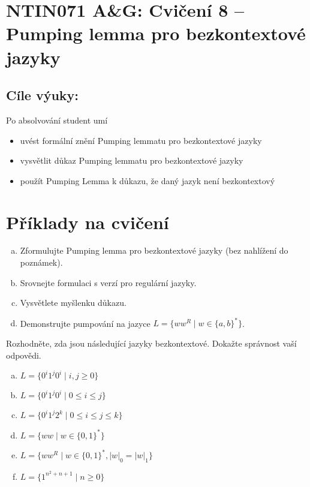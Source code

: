 \documentclass[a4paper,12pt]{amsart}
\begin{document}
\thispagestyle{empty}

\section*{NTIN071 A\&G: Cvičení 8 -- Pumping lemma pro bezkontextové jazyky}

\medskip

\subsection*{Cíle výuky:} Po absolvování student umí

\begin{itemize}\setlength{\itemsep}{0pt}
    \item uvést formální znění Pumping lemmatu pro bezkontextové jazyky
    \item vysvětlit důkaz Pumping lemmatu pro bezkontextové jazyky
    \item použít Pumping Lemma k důkazu, že daný jazyk není bezkontextový
\end{itemize}


\section*{Příklady na cvičení}


\medskip\begin{problem}
    
    \begin{enumerate}[(a)]\setlength\itemsep{6pt}
        \item Zformulujte Pumping lemma pro bezkontextové jazyky (bez nahlížení do poznámek).
        \item Srovnejte formulaci s verzí pro regulární jazyky. 
        \item Vysvětlete myšlenku důkazu.
        \item Demonstrujte pumpování na jazyce $L=\{ww^R\mid w\in \{a,b\}^*\}$.
    \end{enumerate}

\end{problem}

\medskip\begin{problem}

    Rozhodněte, zda jsou následující jazyky bezkontextové. Dokažte správnost vaší odpovědi.
    
    \begin{enumerate}[(a)]
        \setlength\itemsep{6pt}
        \item $L=\{0^i1^j0^i\mid i,j\geq 0\}$
        \item $L=\{0^i1^j0^i\mid 0\leq i\leq j\}$
        \item $L=\{0^i1^j2^k\mid 0\leq i\leq j\leq k\}$
        \item $L=\{ww\mid w\in \{0,1\}^*\}$
        \item $L=\{ww^R\mid w\in \{0,1\}^*, |w|_0=|w|_1\}$
        \item $L=\{1^{n^2+n+1}\mid n\geq 0\}$
    \end{enumerate}

\end{problem}
\end{document}
